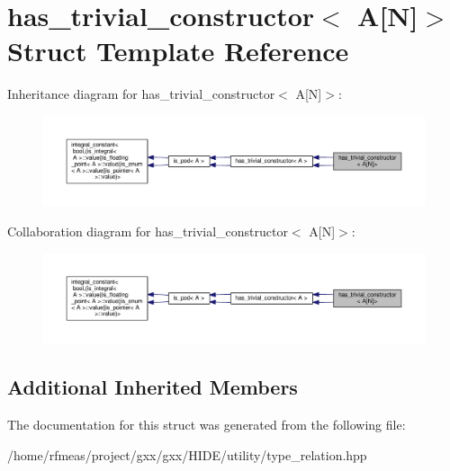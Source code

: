 \hypertarget{structhas__trivial__constructor_3_01A[N]_4}{}\section{has\+\_\+trivial\+\_\+constructor$<$ A\mbox{[}N\mbox{]}$>$ Struct Template Reference}
\label{structhas__trivial__constructor_3_01A[N]_4}


Inheritance diagram for has\+\_\+trivial\+\_\+constructor$<$ A\mbox{[}N\mbox{]}$>$\+:
\nopagebreak
\begin{figure}[H]
\begin{center}
\leavevmode
\includegraphics[width=350pt]{structhas__trivial__constructor_3_01A[N]_4__inherit__graph}
\end{center}
\end{figure}


Collaboration diagram for has\+\_\+trivial\+\_\+constructor$<$ A\mbox{[}N\mbox{]}$>$\+:
\nopagebreak
\begin{figure}[H]
\begin{center}
\leavevmode
\includegraphics[width=350pt]{structhas__trivial__constructor_3_01A[N]_4__coll__graph}
\end{center}
\end{figure}
\subsection*{Additional Inherited Members}


The documentation for this struct was generated from the following file\+:\begin{DoxyCompactItemize}
\item 
/home/rfmeas/project/gxx/gxx/\+H\+I\+D\+E/utility/type\+\_\+relation.\+hpp\end{DoxyCompactItemize}
